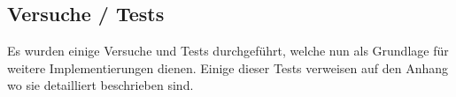\subsection{Versuche / Tests}
Es wurden einige Versuche und Tests durchgeführt, welche nun als Grundlage für weitere Implementierungen dienen. Einige dieser Tests verweisen auf den Anhang wo sie detailliert beschrieben sind.




\newpage

\newpage

